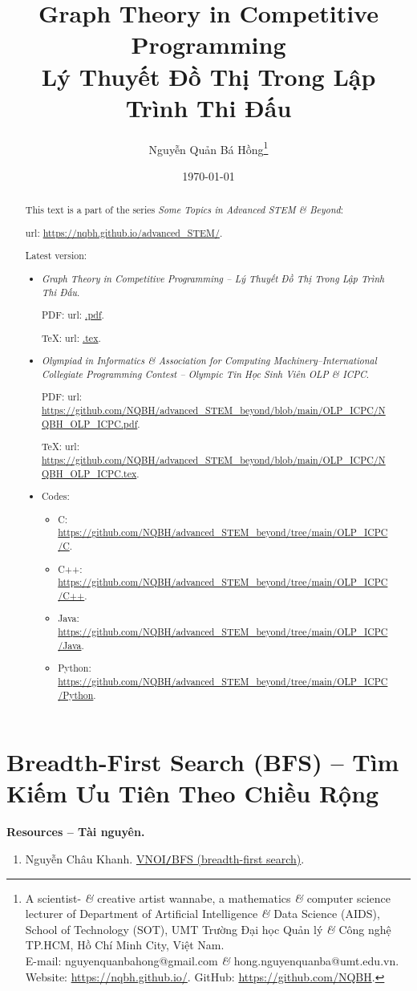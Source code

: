 \documentclass{article}
\title{Graph Theory in Competitive Programming\\Lý Thuyết Đồ Thị Trong Lập Trình Thi Đấu}
\author{Nguyễn Quản Bá Hồng\footnote{A scientist- {\it\&} creative artist wannabe, a mathematics {\it\&} computer science lecturer of Department of Artificial Intelligence {\it\&} Data Science (AIDS), School of Technology (SOT), UMT Trường Đại học Quản lý {\it\&} Công nghệ TP.HCM, Hồ Chí Minh City, Việt Nam.\\E-mail: {\sf nguyenquanbahong@gmail.com} {\it\&} {\sf hong.nguyenquanba@umt.edu.vn}. Website: \url{https://nqbh.github.io/}. GitHub: \url{https://github.com/NQBH}.}}
\date{\today}
\begin{document}
\maketitle
\begin{abstract}
    This text is a part of the series {\it Some Topics in Advanced STEM \& Beyond}:

    {\sc url}: \url{https://nqbh.github.io/advanced_STEM/}.

    Latest version:
    \begin{itemize}
        \item {\it Graph Theory in Competitive Programming -- Lý Thuyết Đồ Thị Trong Lập Trình Thi Đấu}.

        PDF: {\sc url}: \url{.pdf}.

        \TeX: {\sc url}: \url{.tex}.
        \item {\it Olympiad in Informatics \& Association for Computing Machinery--International Collegiate Programming Contest -- Olympic Tin Học Sinh Viên OLP \& ICPC}.

        PDF: {\sc url}: \url{https://github.com/NQBH/advanced_STEM_beyond/blob/main/OLP_ICPC/NQBH_OLP_ICPC.pdf}.

        \TeX: {\sc url}: \url{https://github.com/NQBH/advanced_STEM_beyond/blob/main/OLP_ICPC/NQBH_OLP_ICPC.tex}.
        \item Codes:
        \begin{itemize}
            \item C: \url{https://github.com/NQBH/advanced_STEM_beyond/tree/main/OLP_ICPC/C}.
            \item C++: \url{https://github.com/NQBH/advanced_STEM_beyond/tree/main/OLP_ICPC/C++}.
            \item Java: \url{https://github.com/NQBH/advanced_STEM_beyond/tree/main/OLP_ICPC/Java}.
            \item Python: \url{https://github.com/NQBH/advanced_STEM_beyond/tree/main/OLP_ICPC/Python}.
        \end{itemize}
    \end{itemize}
\end{abstract}
\tableofcontents


\section{Breadth-First Search (BFS) -- Tìm Kiếm Ưu Tiên Theo Chiều Rộng}
\textbf{\textsf{Resources -- Tài nguyên.}}
\begin{enumerate}
    \item {\sc Nguyễn Châu Khanh}. \href{https://wiki.vnoi.info/algo/graph-theory/breadth-first-search.md}{VNOI{\tt/}BFS (breadth-first search)}.
\end{enumerate}
\end{document}
